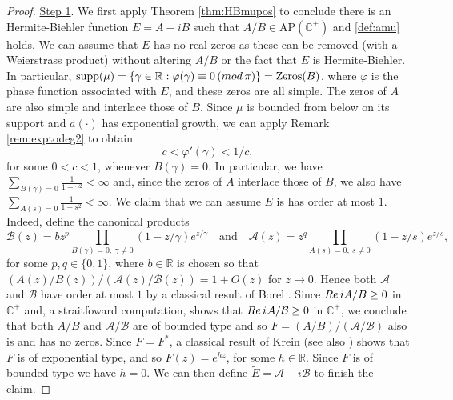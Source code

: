 \documentclass[a4paper,reqno,12pt]{amsart}
\DeclareMathOperator{\supp}{\mathrm{supp}}
\newcommand{\A}{\mathcal{A}}
\newcommand{\B}{\mathcal{B}}
\renewcommand{\H}{\mathbb{C}^+}
\renewcommand{\r}{\mathbb{R}}
\newcommand{\re}{{\rm Re}\,}
\newcommand{\ga}{\gamma}
\newcommand{\p}{\varphi}
\newcommand{\1}{{\bf 1}}
\newcommand{\apc}{\mathrm{AP}(\H)}
\renewcommand{\1}{{\bo 1}}
\renewcommand{\a}{a(\cdot)}
\begin{document}
\begin{proof}
\underline{Step 1}. We first apply Theorem \ref{thm:HBmupos} to conclude there is an Hermite-Biehler function $E=A-iB$ such that $A/B\in \apc$ and \eqref{def:amu} holds.  We can assume that $E$ has no real zeros as these can be removed (with a Weierstrass product) without altering $A/B$ or the fact that $E$ is Hermite-Biehler. In particular, $\supp(\mu)=\{\ga\in \r : \p(\ga)\equiv 0 \,({\rm mod} \, \pi)\}=\text{Zeros}(B)$, where $\p$ is the phase function associated with $E$, and these zeros are all simple. The zeros of $A$ are also simple and interlace  those of $B$. Since $\mu$ is bounded from below on its support and $\a$ has exponential growth,  we can apply Remark \ref{rem:exptodeg2} to obtain $$c<\p'(\ga)<1/c,$$ for some $0<c<1$, whenever $B(\ga)=0$. In particular, we have $\sum_{B(\ga)=0} \frac{1}{1+\ga^{2}}<\infty$ and, since the zeros of $A$ interlace those of $B$, we also have $\sum_{A(s)=0} \frac{1}{1+s^{2}}<\infty$.  We claim that we can assume $E$ is has order at most $1$. Indeed, define the canonical products
$$
\B(z) = b z^p \prod_{B(\ga) = 0,\ \ga\neq 0} (1-z/\ga)e^{z/\ga} \quad \text{and} \quad \A(z) = z^q \prod_{A(s) = 0,\ s\neq 0} (1-z/s)e^{z/s},
$$
for some $p,q\in \{0,1\}$, where $b\in\r$ is chosen so that $(A(z)/B(z))/(\A(z)/\B(z))=1+O(z)$ for $z\to 0$. Hence both $\A$ and $\B$ have order at most $1$ by a classical result of Borel \cite[Thm. 6, p. 16]{L}. Since $\re iA/B \geq 0$ in $\H$ and, a straitfoward computation, shows that $\re i\A/\B\geq 0$ in $\H$, we conclude that both $A/B$ and $\A/\B$ are of bounded type and so $F= (A/B)/(\A/\B)$ also is and has no zeros. Since $F=F^*$, a classical result of Krein \cite{Kr} (see also \cite[Thm. 1, p. 115]{L2}) shows that $F$ is of exponential type, and so $F(z)=e^{hz}$, for some $h\in \r$. Since $F$ is of bounded type we have $h=0$. We can then define $\widetilde{E} =\A-i\B$ to finish the claim.


\end{proof}
\end{document}
